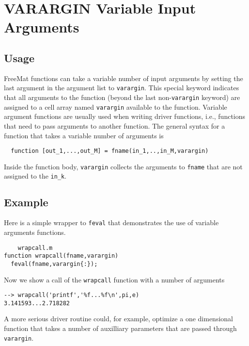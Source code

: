 \section{VARARGIN Variable Input Arguments}

\subsection{Usage}

FreeMat functions can take a variable number of input arguments
by setting the last argument in the argument list to \verb|varargin|.
This special keyword indicates that all arguments to the
function (beyond the last non-\verb|varargin| keyword) are assigned
to a cell array named \verb|varargin| available to the function.
Variable argument functions are usually used when writing 
driver functions, i.e., functions that need to pass arguments
to another function.  The general syntax for a function that
takes a variable number of arguments is
\begin{verbatim}
  function [out_1,...,out_M] = fname(in_1,..,in_M,varargin)
\end{verbatim}
Inside the function body, \verb|varargin| collects the arguments 
to \verb|fname| that are not assigned to the \verb|in_k|.
\subsection{Example}

Here is a simple wrapper to \verb|feval| that demonstrates the
use of variable arguments functions.
\begin{verbatim}
    wrapcall.m
function wrapcall(fname,varargin)
  feval(fname,varargin{:});
\end{verbatim}
Now we show a call of the \verb|wrapcall| function with a number
of arguments
\begin{verbatim}
--> wrapcall('printf','%f...%f\n',pi,e)
3.141593...2.718282
\end{verbatim}
A more serious driver routine could, for example, optimize
a one dimensional function that takes a number of auxilliary
parameters that are passed through \verb|varargin|.
